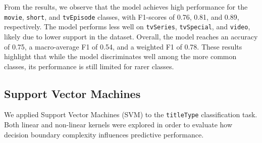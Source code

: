 From the results, we observe that the model achieves high performance for the 
\texttt{movie}, \texttt{short}, and \texttt{tvEpisode} classes, with F1-scores of 0.76, 
0.81, and 0.89, respectively. The model performs less well on \texttt{tvSeries}, 
\texttt{tvSpecial}, and \texttt{video}, likely due to lower support in the dataset.
Overall, the model reaches an accuracy of 0.75, 
a macro-average F1 of 0.54, and a weighted F1 of 0.78. These results highlight that 
while the model discriminates well among the more common classes, its performance is still
limited for rarer classes. 










\subsection{Support Vector Machines}
\label{subsec:svm}


We applied Support Vector Machines (SVM) to the \texttt{titleType} classification task.
Both linear and non-linear kernels were explored in order to evaluate how decision boundary complexity influences predictive performance.

